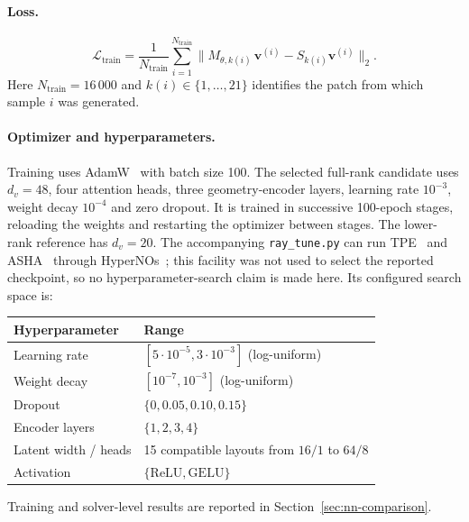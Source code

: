 \documentclass{article}
\newcommand{\vect}[1]{\boldsymbol{#1}}
\newcommand{\Sloc}[1]{S_{#1}}                    %
\newcommand{\dv}{d_v}                             %
\theoremstyle{plain}
\numberwithin{equation}{section}
\begin{document}
\paragraph{Loss.}
\begin{equation}
    \mathcal L_{\mathrm{train}}
    = \frac{1}{N_{\mathrm{train}}}
    \sum_{i=1}^{N_{\mathrm{train}}}
    \bigl\|M_{\theta,k(i)}\,\vect{v}^{(i)}
    - \Sloc{k(i)}\vect{v}^{(i)}
    \bigr\|_2.
    \label{eq:loss}
\end{equation}
Here $N_{\mathrm{train}}=16\,000$ and $k(i)\in\{1,\ldots,21\}$ identifies the
patch from which sample $i$ was generated.

\paragraph{Optimizer and hyperparameters.}
Training uses AdamW~\cite{loshchilov2019decoupledweightdecayregularization}
with batch size 100.  The selected full-rank candidate uses $\dv=48$, four
attention heads, three geometry-encoder layers, learning rate $10^{-3}$,
weight decay $10^{-4}$ and zero dropout.  It is trained in successive
100-epoch stages, reloading the weights and restarting the optimizer between
stages.  The lower-rank reference has $\dv=20$.  The accompanying
\texttt{ray\_tune.py} can run TPE~\cite{watanabe2023tree,bergstra2015hyperopt}
and ASHA~\cite{li2020massivelyparallelhyperparametertuning} through
HyperNOs~\cite{ghiotto2025hypernos}; this facility was not used to select the
reported checkpoint, so no hyperparameter-search claim is made here.  Its
configured search space is:
\begin{center}
    \begin{tabular}{ll}
        \toprule
        Hyperparameter                       & Range                                         \\
        \midrule
        Learning rate                        & $[5\cdot10^{-5},3\cdot10^{-3}]$ (log-uniform) \\
        Weight decay                         & $[10^{-7},10^{-3}]$ (log-uniform)             \\
        Dropout~\cite{srivastava2014dropout} & $\{0,0.05,0.10,0.15\}$                        \\
        Encoder layers                       & $\{1,2,3,4\}$                                 \\
        Latent width / heads                 & 15 compatible layouts from $16/1$ to $64/8$   \\
        Activation                           & $\{\mathrm{ReLU},\mathrm{GELU}\}$             \\
        \bottomrule
    \end{tabular}
\end{center}
Training and solver-level results are reported in
Section~\ref{sec:nn-comparison}.
\end{document}
